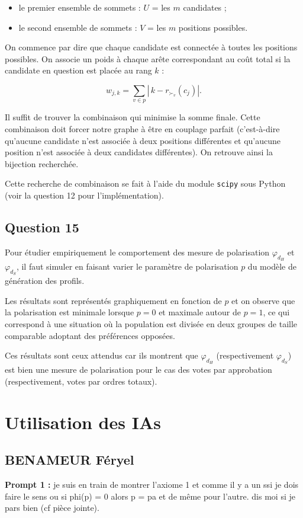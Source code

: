 \documentclass[11pt]{article}
\begin{document}
\begin{itemize}
	\item le premier ensemble de sommets :  
  \( U \) = les \( m \) candidates ;
  \item le second ensemble de sommets :  
  \( V \) = les \( m \) positions possibles.
\end{itemize}

On commence par dire que chaque candidate est connectée à toutes les positions possibles.  
On associe un poids à chaque arête correspondant au coût total si la candidate en question est placée au rang \( k \) :

\[
w_{j,k} = \sum_{v \in p} |\, k - r_{\succ_v}(c_j)|.
\]

Il suffit de trouver la combinaison qui minimise la somme finale.  
Cette combinaison doit forcer notre graphe à être en couplage parfait  
(c’est-à-dire qu’aucune candidate n’est associée à deux positions différentes et qu’aucune position n’est associée à deux candidates différentes).  
On retrouve ainsi la bijection recherchée.

Cette recherche de combinaison se fait à l’aide du module \texttt{scipy} sous Python  
(voir la question 12 pour l’implémentation).

\subsection{Question 15}
Pour étudier empiriquement le comportement des mesure de polarisation $\varphi_{d_H}$ et $\varphi_{d_S}$, il faut simuler en faisant varier le paramètre de polarisation $p$ du modèle de génération des profils.

Les résultats sont représentés graphiquement en fonction de $p$ et on observe que la polarisation est minimale lorsque $p = 0$ et maximale autour de $p = 1$, ce qui correspond à une situation où la population est divisée en deux groupes de taille comparable adoptant des préférences opposées. 

Ces résultats sont ceux attendus car ils montrent que $\varphi_{d_H}$ (respectivement $\varphi_{d_S}$) est bien une mesure de polarisation pour le cas des votes par approbation (respectivement, votes par ordres totaux).


\section{Utilisation des IAs}

\subsection{BENAMEUR Féryel}
\textbf{Prompt 1 :} je suis en train de montrer l'axiome 1 et comme il y a un ssi je dois faire le sens ou si phi(p) = 0 alors p = pa et de même pour l'autre. dis moi si je pars bien (cf pièce jointe).
\end{document}

